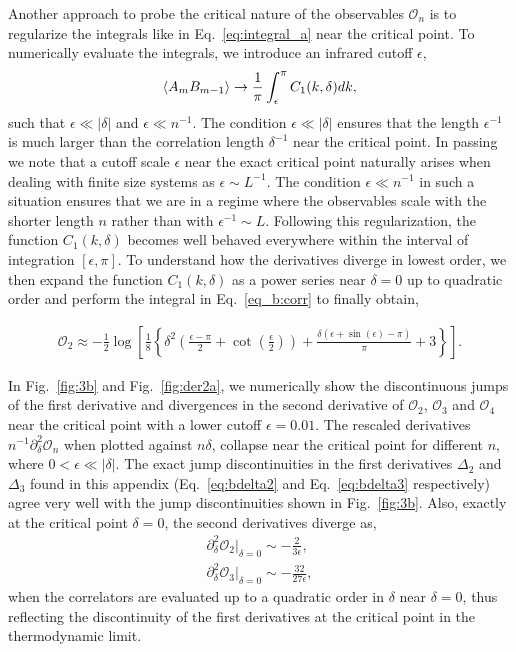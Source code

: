 \documentclass[aps,prx,twocolumn]{revtex4-2}
\begin{document}
{{ Another approach to probe the critical nature of the observables $\mathcal{O}_n$ is to regularize the integrals like in Eq.~\eqref{eq:integral_a} near the critical point. To numerically evaluate the integrals, we introduce an infrared cutoff $\epsilon$,
\begin{equation}\label{eq_b:corr}
	\braket{A_mB_{m-1}}\rightarrow\frac{1}{\pi}\int_{\epsilon}^{\pi}C_1(k,\delta)dk,
\end{equation}
such that $\epsilon\ll|\delta|$ and $\epsilon\ll n^{-1}$. The condition $\epsilon\ll|\delta|$ ensures that the length $\epsilon^{-1}$ is much larger than the correlation length $\delta^{-1}$ near the critical point. In passing we note that a cutoff scale $\epsilon$ near the exact critical point naturally arises when dealing with finite size systems as $\epsilon\sim L^{-1}$. The condition $\epsilon\ll n^{-1}$ in such a situation ensures that we are in a regime where the observables scale with the shorter length $n$ rather than with  $\epsilon^{-1}\sim L$. Following this regularization, the function $C_1(k,\delta)$ becomes well behaved everywhere within the interval of integration $\left[\epsilon,\pi\right]$. To understand how the derivatives diverge in lowest order, we then expand the function $C_1(k,\delta)$ as a power series near $\delta=0$ up to quadratic order and perform the integral in Eq.~\eqref{eq_b:corr} to finally obtain,
\begin{widetext}
	\begin{eqnarray}\label{eq_a:o2regular}
		\mathcal{O}_2\approx-\frac{1}{2} \log \left[\frac{1}{8} \left\{\delta ^2 \left(\frac{\epsilon -\pi }{2}+\cot \left(\frac{\epsilon }{2}\right)\right)+\frac{\delta  (\epsilon +\sin (\epsilon )-\pi )}{\pi }+3\right\}\right].
	\end{eqnarray}
\end{widetext}
In Fig.~\ref{fig:3b} and Fig.~\ref{fig:der2a}, we numerically show the discontinuous jumps of the first derivative and divergences in the second derivative of $\mathcal{O}_2$, $\mathcal{O}_3$ and $\mathcal{O}_4$ near the critical point with a lower cutoff $\epsilon=0.01$. The rescaled derivatives $n^{-1}\partial_{\delta}^2\mathcal{O}_n$ when plotted against $n\delta$, collapse near the critical point for different $n$, where $0<\epsilon\ll|\delta|$. The exact jump discontinuities in the first derivatives $\Delta_2$ and $\Delta_3$ found in this appendix (Eq.~\eqref{eq:bdelta2} and Eq.~\eqref{eq:bdelta3} respectively) agree very well with the jump discontinuities shown in Fig.~\ref{fig:3b}. Also, exactly at the critical point $\delta=0$, the second derivatives diverge as,
\begin{eqnarray}
	\partial_{\delta}^2\mathcal{O}_2\left.\right|_{\delta=0}\sim-\frac{2}{3 \epsilon },\\
	\partial_{\delta}^2\mathcal{O}_3\left.\right|_{\delta=0}\sim-\frac{32}{27 \epsilon },
\end{eqnarray}
when the correlators are evaluated up to a quadratic order in $\delta$ near $\delta=0$, thus reflecting the discontinuity of the first derivatives at the critical point in the thermodynamic limit.

}}
\end{document}

